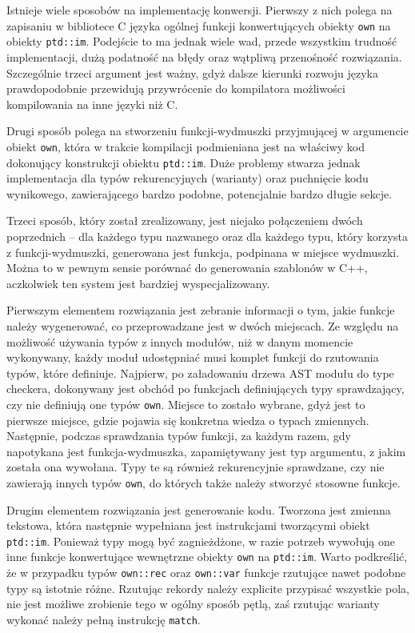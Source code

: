 \documentclass[licencjacka]{pracamgr}
\begin{document}
Istnieje wiele sposobów na implementację konwersji. Pierwszy z nich polega na zapisaniu w bibliotece C języka ogólnej funkcji konwertujących obiekty \texttt{own} na obiekty \texttt{ptd::im}.
Podejście to ma jednak wiele wad, przede wszystkim trudność implementacji, dużą podatność na błędy oraz wątpliwą przenośność rozwiązania.
Szczególnie trzeci argument jest ważny, gdyż dalsze kierunki rozwoju języka prawdopodobnie przewidują przywrócenie do kompilatora możliwości kompilowania na inne języki niż C.

Drugi sposób polega na stworzeniu funkcji-wydmuszki przyjmującej w argumencie obiekt \texttt{own}, która w trakcie kompilacji podmieniana jest na właściwy kod dokonujący konstrukcji obiektu \texttt{ptd::im}.
Duże problemy stwarza jednak implementacja dla typów rekurencyjnych (warianty) oraz puchnięcie kodu wynikowego, zawierającego bardzo podobne, potencjalnie bardzo długie sekcje.

Trzeci sposób, który został zrealizowany, jest niejako połączeniem dwóch poprzednich -- dla każdego typu
nazwanego oraz dla każdego typu, który korzysta z funkcji-wydmuszki, generowana jest funkcja,
podpinana w miejsce wydmuszki. Można to w pewnym sensie porównać do generowania szablonów w C++, aczkolwiek ten system jest bardziej wyspecjalizowany.

Pierwszym elementem rozwiązania jest zebranie informacji o tym, jakie funkcje należy wygenerować,
co przeprowadzane jest w dwóch miejscach.
Ze względu na możliwość używania typów z innych modułów, niż w danym momencie wykonywany, każdy moduł udostępniać musi komplet funkcji do rzutowania typów, które definiuje.
Najpierw, po załadowaniu drzewa AST modułu do type checkera, dokonywany jest obchód po funkcjach definiujących typy sprawdzający, czy nie definiują one typów \texttt{own}.
Miejsce to zostało wybrane, gdyż jest to pierwsze miejsce, gdzie pojawia się konkretna wiedza o typach zmiennych.
Następnie, podczas sprawdzania typów funkcji, za każdym razem, gdy napotykana jest funkcja-wydmuszka, zapamiętywany jest typ argumentu, z jakim została ona wywołana.
Typy te są również rekurencyjnie sprawdzane, czy nie zawierają innych typów \texttt{own}, do których także należy stworzyć stosowne funkcje.

Drugim elementem rozwiązania jest generowanie kodu. Tworzona jest zmienna tekstowa, która następnie wypełniana jest instrukcjami tworzącymi obiekt \texttt{ptd::im}.
Ponieważ typy mogą być zagnieżdżone, w razie potrzeb wywołują one inne funkcje konwertujące wewnętrzne obiekty \texttt{own} na \texttt{ptd::im}.
Warto podkreślić, że w przypadku typów \texttt{own::rec} oraz \texttt{own::var} funkcje rzutujące nawet podobne typy są istotnie różne.
Rzutując rekordy należy explicite przypisać wszystkie pola, nie jest możliwe zrobienie tego w ogólny sposób pętlą, zaś rzutując warianty
wykonać należy pełną instrukcję \texttt{match}.
\end{document}
